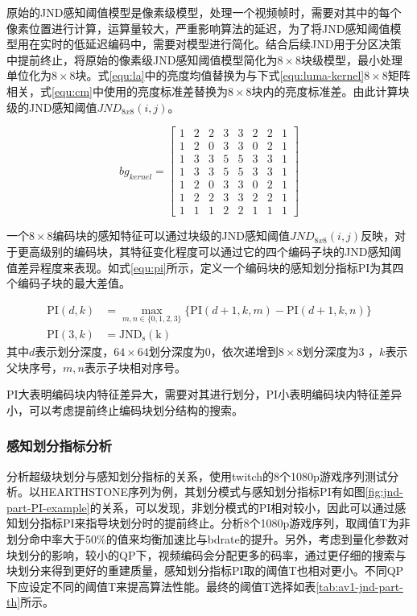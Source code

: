   原始的JND感知阈值模型是像素级模型，处理一个视频帧时，需要对其中的每个像素位置进行计算，运算量较大，严重影响算法的延迟，为了将JND感知阈值模型用在实时的低延迟编码中，需要对模型进行简化。结合后续JND用于分区决策中提前终止，将原始的像素级JND感知阈值模型简化为$8\times 8$块级模型，最小处理单位化为$8\times 8$块。式\ref{equ:la}中的亮度均值替换为与下式\ref{equ:luma-kernel}$8\times 8$矩阵相关，式\ref{equ:cm}中使用的亮度标准差替换为$8\times 8$块内的亮度标准差。由此计算块级的JND感知阈值$JND_{8x8}(i, j)$。

  \begin{equation} \label{equ:luma-kernel}
    bg_{kernel} = \left[ \begin{matrix}
      1& 2& 2& 3& 3& 2& 2& 1 \\
      1& 2& 0& 3& 3& 0& 2& 1 \\
      1& 3& 3& 5& 5& 3& 3& 1 \\
      1& 3& 3& 5& 5& 3& 3& 1 \\
      1& 2& 0& 3& 3& 0& 2& 1 \\
      1& 2& 2& 3& 3& 2& 2& 1 \\
      1& 1& 1& 2& 2& 1& 1& 1
    \end{matrix}\right]
  \end{equation}

  一个$8\times 8$编码块的感知特征可以通过块级的JND感知阈值$JND_{8x8}(i, j)$反映，对于更高级别的编码块，其特征变化程度可以通过它的四个编码子块的JND感知阈值差异程度来表现。如式\ref{equ:pi}所示，定义一个编码块的感知划分指标PI为其四个编码子块的最大差值。

  \begin{align} \label{equ:pi}
    \mathrm{PI}(d, k) &= \max_{m,n\in \{0, 1, 2, 3\}} \{\mathrm{PI}(d+1, k, m) - \mathrm{PI}(d+1,k, n) \} \\
    \mathrm{PI}(3, k) &= \mathrm{JND_s(k)}
  \end{align}
  其中$d$表示划分深度，$64\times 64$划分深度为0，依次递增到$8\times 8$划分深度为3 ，$k$表示父块序号，$m, n$表示子块相对序号。

  PI大表明编码块内特征差异大，需要对其进行划分，PI小表明编码块内特征差异小，可以考虑提前终止编码块划分结构的搜索。

  \subsubsection{感知划分指标分析}

  分析超级块划分与感知划分指标的关系，使用twitch的8个1080p游戏序列测试分析。以HEARTHSTONE序列为例，其划分模式与感知划分指标PI有如图\ref{fig:jnd-part-PI-example}的关系，可以发现，非划分模式的PI相对较小，因此可以通过感知划分指标PI来指导块划分时的提前终止。分析8个1080p游戏序列，取阈值T为非划分命中率大于50\%的值来均衡加速比与bdrate的提升。另外，考虑到量化参数对块划分的影响，较小的QP下，视频编码会分配更多的码率，通过更仔细的搜索与块划分来得到更好的重建质量，感知划分指标PI取的阈值T也相对更小。不同QP下应设定不同的阈值T来提高算法性能。最终的阈值T选择如表\ref{tab:av1-jnd-part-th}所示。

